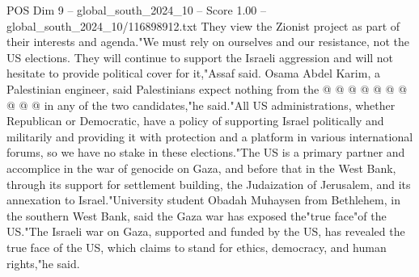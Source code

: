 \begin{textsample}{POS Dim 9 – global\_south\_2024\_10 – Score 1.00 – global\_south\_2024\_10/116898912.txt}
They view the Zionist project as part of their interests and agenda."We must rely on ourselves and our resistance, not the US elections.
They will continue to support the Israeli aggression and will not hesitate to provide political cover for it,"Assaf said.
Osama Abdel Karim, a Palestinian engineer, said Palestinians expect nothing from the @ @ @ @ @ @ @ @ @ @ in any of the two candidates,"he said."All US administrations, whether Republican or Democratic, have a policy of supporting Israel politically and militarily and providing it with protection and a platform in various international forums, so we have no stake in these elections."The US is a primary partner and accomplice in the war of genocide on Gaza, and before that in the West Bank, through its support for settlement building, the Judaization of Jerusalem, and its annexation to Israel."University student Obadah Muhaysen from Bethlehem, in the southern West Bank, said the Gaza war has exposed the"true face"of the US."The Israeli war on Gaza, supported and funded by the US, has revealed the true face of the US, which claims to stand for ethics, democracy, and human rights,"he said.

\end{textsample}
